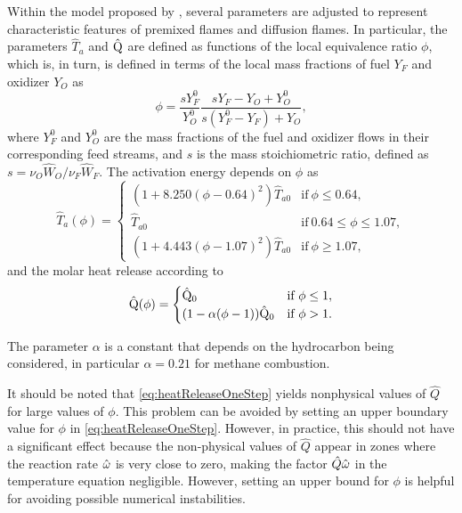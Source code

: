 Within the model proposed by \textcite{fernandez-tarrazoSimpleOnestepChemistry2006}, several parameters are adjusted to represent characteristic features of premixed flames and diffusion flames. In particular, the parameters $\hat T_a$ and $\hat {\mathrm{Q}}$ are defined as functions of the local equivalence ratio $\phi$, which is, in turn, is defined in terms of the local mass fractions of fuel $Y_F$ and oxidizer $Y_O$ as
\begin{equation}\label{eq:equivalenceRatio}
	\phi = \frac{s Y_F^0}{Y_O^0}\frac{s Y_F-Y_O+Y_O^0}{s(Y_F^0-Y_F) + Y_O},
\end{equation}
where $Y_F^0$ and $Y_O^0$ are the mass fractions of the fuel and oxidizer flows in their corresponding feed streams, and $s$ is the mass stoichiometric ratio, defined as $s =\nu_O \hat W_O/\nu_F \hat W_F$.
The activation energy depends on $\phi$ as
\begin{equation}
	\hat{T}_a(\phi)=
	\begin{cases}
		(1 + 8.250(\phi-0.64)^2) \hat{T}_{a0} & \text{if}~ 	\phi \leq 0.64,           \\
		\hat{T}_{a0}                          & \text{if}~ 	0.64 \leq \phi \leq 1.07, \\
		(1 + 4.443(\phi-1.07)^2)\hat{T}_{a0}  & \text{if}~\phi \geq 1.07,
	\end{cases} \label{eq:ActivationTemperatureOneStep}
\end{equation}
and the molar heat release according to
\begin{equation}
	\hat{\mathrm{Q}}(\phi)=
	\begin{cases}
		\hat{\mathrm{Q}}_0                      & \text{if}~ \phi \leq 1, \\
		(1 - \alpha(\phi -1))\hat{\mathrm{Q}}_0 & \text{if}~\phi > 1.
	\end{cases}  \label{eq:heatReleaseOneStep}
\end{equation}

The parameter $\alpha$ is a constant that depends on the hydrocarbon being considered, in particular $\alpha = 0.21$ for methane combustion.

It should be noted that \cref{eq:heatReleaseOneStep} yields nonphysical values of $\hat Q$ for large values of $\phi$. This problem can be avoided by setting an upper boundary value for $\phi$ in \cref{eq:heatReleaseOneStep}. However, in practice, this should not have a significant effect because the non-physical values of $\hat Q$ appear in zones where the reaction rate $\hat{\omega}$ is very close to zero, making the factor $\hat Q \hat{\omega}$ in the temperature equation negligible. However, setting an upper bound for $\phi$ is helpful for avoiding possible numerical instabilities.

